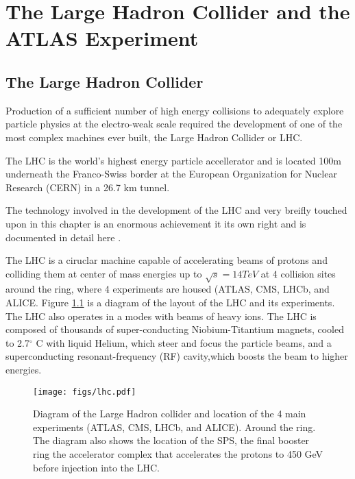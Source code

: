 \chapter[The Large Hadron Collider and the ATLAS Experiment][The Large Hadron Collider and the ATLAS Experiment]{The Large Hadron Collider and the ATLAS Experiment}
\label{chapter:lhc}
\section{The Large Hadron Collider}


Production of a sufficient number of high energy collisions to adequately explore
particle physics at the electro-weak scale required the development of one
of the most complex machines ever built, the Large Hadron Collider or LHC. 

The LHC is the world's highest energy particle accellerator 
and is located 100m underneath the Franco-Swiss border at the European Organization
for Nuclear Research (CERN) in a 26.7 km tunnel. 


The technology involved in the development of the LHC and very breifly
touched upon in this chapter is an enormous achievement
it its own right and is documented in detail here \cite{1748-0221-3-08-S08001,Pettersson:291782,Linnecar:1176380}. 


The LHC is a ciruclar 
machine capable of accelerating beams of protons and colliding them at center of mass 
energies up to $\sqrt{s} = 14 TeV$ at 4 collision sites around the ring, where 4 experiments
are housed (ATLAS\cite{ATLAS_detector}, CMS\cite{748-0221-3-08-S08004}, LHCb\cite{1748-0221-3-08-S08005}, and ALICE\cite{1748-0221-3-08-S08002)}. Figure \ref{figure:lhc_lhc} is a diagram
of the layout of the LHC and its experiments\cite{Team:40525}. The LHC also operates in a modes with beams of 
heavy ions. The LHC is composed of thousands of super-conducting Niobium-Titantium 
magnets, cooled to 2.7$^\circ$ C with liquid Helium, which steer and focus the 
particle beams, and a superconducting resonant-frequency (RF) cavity,which boosts the beam
to higher energies. 

\begin{figure}[!t]
\centering 
\texttt{[image: figs/lhc.pdf]}
\caption{ Diagram of the Large Hadron collider and location of the 4 main experiments (ATLAS, CMS, LHCb, and ALICE). Around
  the ring. The diagram also shows the location of the SPS, the final booster ring the accelerator complex that accelerates
    the protons to 450 GeV before injection into the LHC. 
}
\label{figure:lhc_lhc}
\end{figure}



